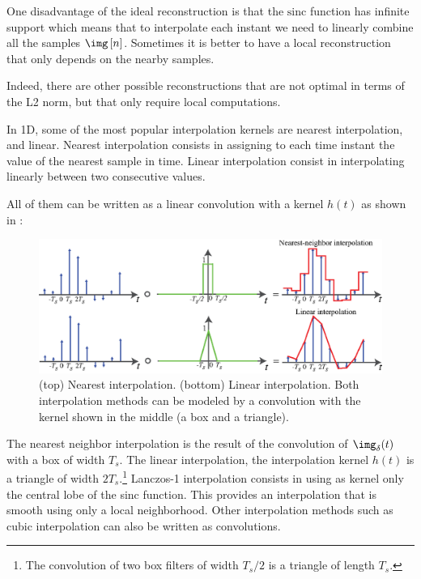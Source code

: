 One disadvantage of the ideal reconstruction is that the $\text{sinc}$ function has infinite support which means that to interpolate each instant we need to linearly combine all the samples $\img \left[n \right]$. Sometimes it is better to have a local reconstruction that only depends on the nearby samples.

Indeed, there are other possible reconstructions that are not optimal in terms of the L2 norm, but that only require local computations.

In 1D, some of the most popular interpolation kernels are nearest interpolation, and linear. Nearest interpolation consists in assigning to each time instant the value of the nearest sample in time. Linear interpolation consist in interpolating linearly between two consecutive values.

All of them can be written as a linear convolution with a kernel $h(t)$ as shown in \fig{\ref{fig:sampling_reconstruction3}}:

\begin{figure}
    \centerline{
        \includegraphics[width=1\linewidth]{figures/Image_processing_sampling/sampling_reconstruction3.eps}
    }
    \caption{(top) Nearest interpolation. (bottom) Linear interpolation. Both interpolation methods can be modeled by a convolution with the kernel shown in the middle (a box and a triangle).}
    \label{fig:sampling_reconstruction3}
\end{figure}

The nearest neighbor interpolation is the result of the convolution of $\img_\delta (t)$ with a box of width $T_s$. The linear interpolation, the interpolation kernel $h(t)$ is a triangle of width $2T_s$.\footnote{The convolution of two box filters of width $T_s/2$ is a triangle of length $T_s$.}
Lanczos-1 interpolation
consists in using as kernel only the central lobe of the sinc function. This provides an interpolation that is smooth using only a local neighborhood. Other interpolation methods such as cubic interpolation can also be written as convolutions.

